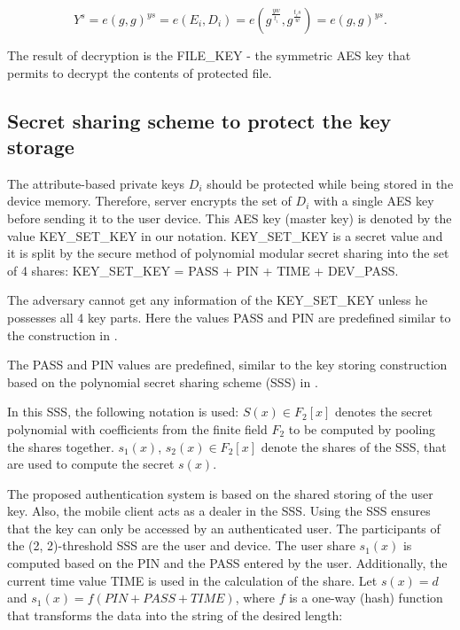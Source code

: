 \documentclass[twocolumn]{svjour3}          	%
\begin{document}
\begin{equation}\label{eq:eq00}
Y^s = e(g,g)^{ys} = e(E_i,D_i) = e(g^{\frac{yw}{t_i}},g^{\frac{t_is}{w}})=e(g,g)^{ys}.
\end{equation}

The result of decryption is the FILE\_KEY - the symmetric AES key that permits to decrypt the contents of protected file. 

\subsection{Secret sharing scheme to protect the key storage }
\label{sec_secret}

The attribute-based private keys $D_i$ should be protected while being stored in the device memory. Therefore, server encrypts the set of $D_i$ with a single AES key before sending it to the user device. This AES key (master key) is denoted by the value KEY\_SET\_KEY in our notation. KEY\_SET\_KEY is a secret value and it is split by the secure method of polynomial modular secret sharing \cite{galibus2015mobile, galibus2008some} into the set of 4 shares: KEY\_SET\_KEY = PASS + PIN + TIME + DEV\_PASS. 

The adversary cannot get any information of the KEY\_SET\_KEY unless he possesses all 4 key parts. Here the values PASS and PIN are predefined similar to the construction in \cite{galibus2015mobile}.

The PASS and PIN values are predefined, similar to the key storing construction based on the polynomial secret sharing scheme (SSS) in \cite{galibus2015cloud}.

In this SSS, the following notation is used: $S(x) \in F_2[x]$ denotes the secret polynomial with coefficients from the finite field $F_2$ to be computed by pooling the shares together. $s_1(x)$, $s_2(x) \in F_2[x]$ denote the shares of the SSS, that are used to compute the secret $s(x)$.

The proposed authentication system is based on the shared storing of the user key. Also, the mobile client acts as a dealer in the SSS. Using the SSS ensures that the key can only be accessed by an authenticated user. The participants of the (2, 2)-threshold SSS are the user and device. The user share $s_1(x)$ is computed based on the PIN and the PASS entered by the user. Additionally, the current time value TIME is used in the calculation of the share. Let $s(x) = d$ and $s_1(x) = f(PIN + PASS + TIME)$, where $f$ is a one-way (hash) function that transforms the data into the string of the desired length: 
\end{document}
